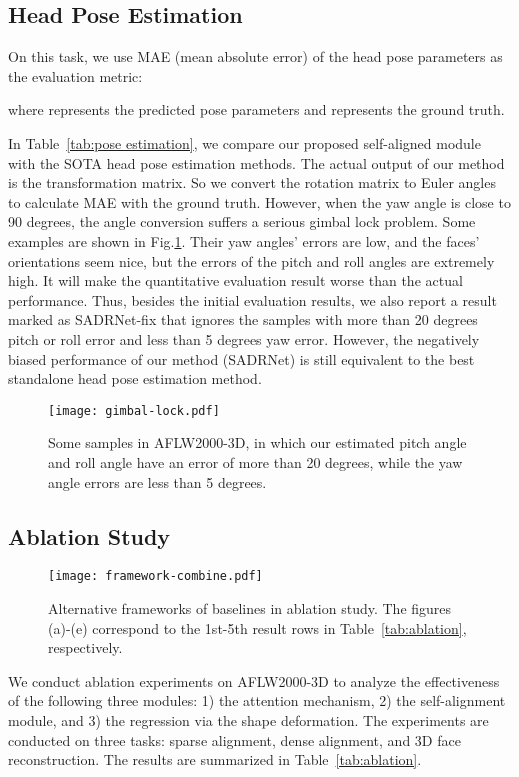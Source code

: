 \documentclass[journal]{IEEEtran}
\begin{document}
	
	\subsection{Head Pose Estimation}
	On this task, we use MAE (mean absolute error) of the head pose parameters as the evaluation metric:
	
	where  represents the predicted pose parameters and  represents the ground truth.
	
	In Table~\ref{tab:pose estimation}, we compare our proposed self-aligned module with the SOTA head pose estimation methods. The actual output of our method is the transformation matrix. So we convert the rotation matrix to Euler angles to calculate MAE with the ground truth. However, when the yaw angle is close to 90 degrees, the angle conversion suffers a serious gimbal lock problem. Some examples are shown in Fig.\ref{fig:gimbal}. Their yaw angles' errors are low, and the faces' orientations seem nice, but the errors of the pitch and roll angles are extremely high. It will make the quantitative evaluation result worse than the actual performance. Thus, besides the initial evaluation results, we also report a result marked as SADRNet-fix that ignores the samples with more than 20 degrees pitch or roll error and less than 5 degrees yaw error.
	However, the negatively biased performance of our method (SADRNet) is still equivalent to the best standalone head pose estimation method.
	
	\begin{figure}[hpt]
		\centering
		\texttt{[image: gimbal-lock.pdf]}
		\caption{Some samples in AFLW2000-3D, in which our estimated pitch angle and roll angle have an error of more than 20 degrees, while the yaw angle errors are less than 5 degrees.}
		\label{fig:gimbal}
	\end{figure}
	
	\subsection{Ablation Study}
	\begin{figure*}[hpt]
		\centering
		\texttt{[image: framework-combine.pdf]}
		\caption{Alternative frameworks of baselines in ablation study. The figures (a)-(e) correspond to the 1st-5th result rows in Table~\ref{tab:ablation}, respectively.}
		\label{fig:ablation_framework}
	\end{figure*}
	We conduct ablation experiments on AFLW2000-3D to analyze the effectiveness of the following three modules: 1) the attention mechanism, 2) the self-alignment module, and 3) the regression via the shape deformation. The experiments are conducted on three
	tasks: sparse alignment, dense alignment, and 3D face reconstruction. The results are summarized in Table~\ref{tab:ablation}.
	
\end{document}
